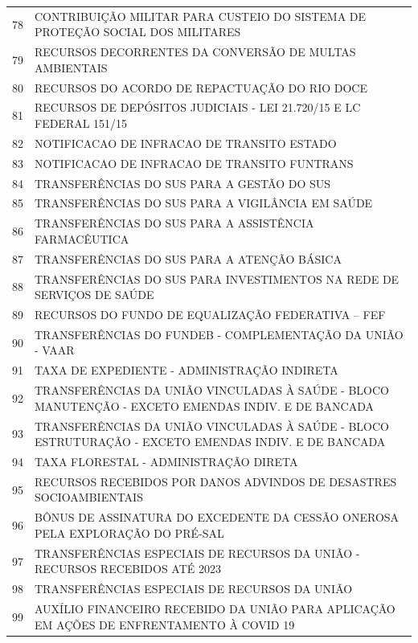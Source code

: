 \documentclass{article}
\begin{document}
\begin{longtable}[c]{m{1cm}|m{11cm}}
\multicolumn{1}{c|}{ 78 } & CONTRIBUIÇÃO MILITAR PARA CUSTEIO DO SISTEMA DE PROTEÇÃO SOCIAL DOS MILITARES \\
\multicolumn{1}{c|}{ 79 } & RECURSOS DECORRENTES DA CONVERSÃO DE MULTAS AMBIENTAIS \\
\multicolumn{1}{c|}{ 80 } & RECURSOS DO ACORDO DE REPACTUAÇÃO DO RIO DOCE \\
\multicolumn{1}{c|}{ 81 } & RECURSOS DE DEPÓSITOS JUDICIAIS - LEI 21.720/15 E LC FEDERAL 151/15 \\
\multicolumn{1}{c|}{ 82 } & NOTIFICACAO DE INFRACAO DE TRANSITO ESTADO \\
\multicolumn{1}{c|}{ 83 } & NOTIFICACAO DE INFRACAO DE TRANSITO FUNTRANS \\
\multicolumn{1}{c|}{ 84 } & TRANSFERÊNCIAS DO SUS PARA A GESTÃO DO SUS \\
\multicolumn{1}{c|}{ 85 } & TRANSFERÊNCIAS DO SUS PARA A VIGILÂNCIA EM SAÚDE \\
\multicolumn{1}{c|}{ 86 } & TRANSFERÊNCIAS DO SUS PARA A ASSISTÊNCIA FARMACÊUTICA \\
\multicolumn{1}{c|}{ 87 } & TRANSFERÊNCIAS DO SUS PARA A ATENÇÃO BÁSICA \\
\multicolumn{1}{c|}{ 88 } & TRANSFERÊNCIAS DO SUS PARA INVESTIMENTOS NA REDE DE SERVIÇOS DE SAÚDE \\
\multicolumn{1}{c|}{ 89 } & RECURSOS DO FUNDO DE EQUALIZAÇÃO FEDERATIVA – FEF \\
\multicolumn{1}{c|}{ 90 } & TRANSFERÊNCIAS DO FUNDEB - COMPLEMENTAÇÃO DA UNIÃO - VAAR \\
\multicolumn{1}{c|}{ 91 } & TAXA DE EXPEDIENTE - ADMINISTRAÇÃO INDIRETA \\
\multicolumn{1}{c|}{ 92 } & TRANSFERÊNCIAS DA UNIÃO VINCULADAS À SAÚDE - BLOCO MANUTENÇÃO - EXCETO EMENDAS INDIV. E DE BANCADA \\
\multicolumn{1}{c|}{ 93 } & TRANSFERÊNCIAS DA UNIÃO VINCULADAS À SAÚDE - BLOCO ESTRUTURAÇÃO - EXCETO EMENDAS INDIV. E DE BANCADA \\
\multicolumn{1}{c|}{ 94 } & TAXA FLORESTAL - ADMINISTRAÇÃO DIRETA \\
\multicolumn{1}{c|}{ 95 } & RECURSOS RECEBIDOS POR DANOS ADVINDOS DE DESASTRES SOCIOAMBIENTAIS \\
\multicolumn{1}{c|}{ 96 } & BÔNUS DE ASSINATURA DO EXCEDENTE DA CESSÃO ONEROSA PELA EXPLORAÇÃO DO PRÉ-SAL \\
\multicolumn{1}{c|}{ 97 } & TRANSFERÊNCIAS ESPECIAIS DE RECURSOS DA UNIÃO - RECURSOS RECEBIDOS ATÉ 2023 \\
\multicolumn{1}{c|}{ 98 } & TRANSFERÊNCIAS ESPECIAIS DE RECURSOS DA UNIÃO \\
\multicolumn{1}{c|}{ 99 } & AUXÍLIO FINANCEIRO RECEBIDO DA UNIÃO PARA APLICAÇÃO EM AÇÕES DE ENFRENTAMENTO À COVID 19 \\
\end{longtable}
\end{document}
